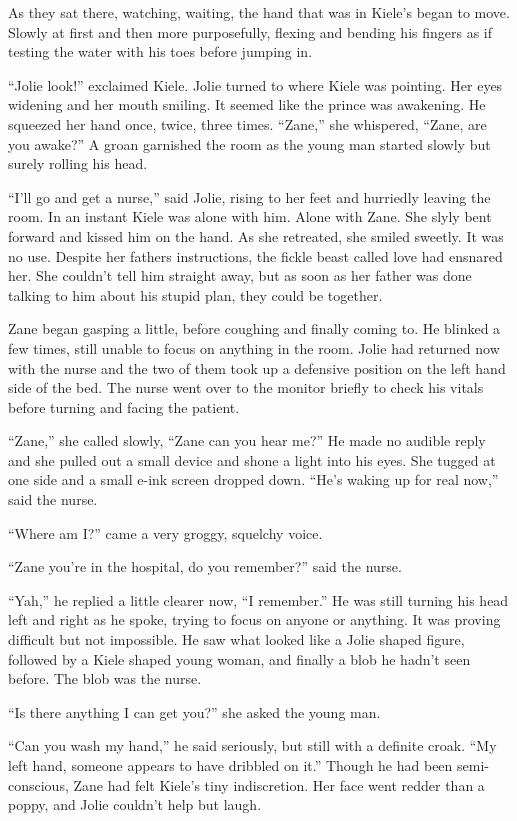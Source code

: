 As they sat there, watching, waiting, the hand that was in Kiele's began to move.  Slowly at first and then more purposefully, flexing and bending his fingers as if testing the water with his toes before jumping in.  

``Jolie look!'' exclaimed Kiele.  Jolie turned to where Kiele was pointing.  Her eyes widening and her mouth smiling.  It seemed like the prince was awakening.  He squeezed her hand once, twice, three times.  ``Zane,'' she whispered, ``Zane, are you awake?''  A groan garnished the room as the young man started slowly but surely rolling his head.

``I'll go and get a nurse,'' said Jolie, rising to her feet and hurriedly leaving the room.  In an instant Kiele was alone with him.  Alone with Zane.  She slyly bent forward and kissed him on the hand.  As she retreated, she smiled sweetly.  It was no use.  Despite her fathers instructions, the fickle beast called love had ensnared her.  She couldn't tell him straight away, but as soon as her father was done talking to him about his stupid plan, they could be together.  

Zane began gasping a little, before coughing and finally coming to.  He blinked a few times, still unable to focus on anything in the room.  Jolie had returned now with the nurse and the two of them took up a defensive position on the left hand side of the bed.  The nurse went over to the monitor briefly to check his vitals before turning and facing the patient.  

``Zane,'' she called slowly, ``Zane can you hear me?''  He made no audible reply and she pulled out a small device and shone a light into his eyes.  She tugged at one side and a small e-ink screen dropped down.  ``He's waking up for real now,'' said the nurse.  

``Where am I?'' came a very groggy, squelchy voice.

``Zane you're in the hospital, do you remember?'' said the nurse.

``Yah,'' he replied a little clearer now, ``I remember.''  He was still turning his head left and right as he spoke, trying to focus on anyone or anything.  It was proving difficult but not impossible.  He saw what looked like a Jolie shaped figure, followed by a Kiele shaped young woman, and finally a blob he hadn't seen before.  The blob was the nurse.  

``Is there anything I can get you?'' she asked the young man.

``Can you wash my hand,'' he said seriously, but still with a definite croak.  ``My left hand, someone appears to have dribbled on it.''  Though he had been semi-conscious, Zane had felt Kiele's tiny indiscretion.  Her face went redder than a poppy, and Jolie couldn't help but laugh.  

